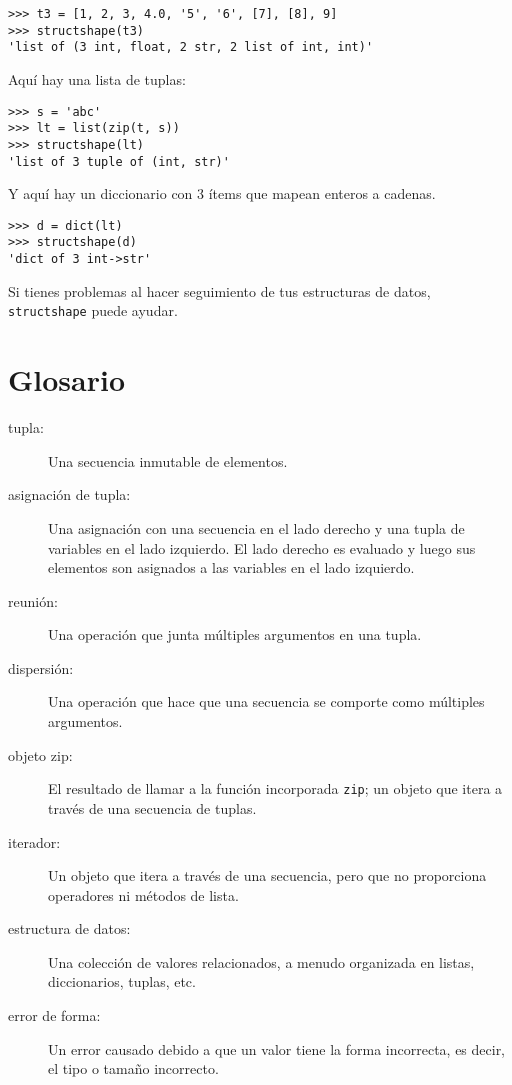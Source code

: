 \documentclass[10pt]{book}
\begin{document}
\begin{verbatim}
>>> t3 = [1, 2, 3, 4.0, '5', '6', [7], [8], 9]
>>> structshape(t3)
'list of (3 int, float, 2 str, 2 list of int, int)'
\end{verbatim}
%
Aquí hay una lista de tuplas:

\begin{verbatim}
>>> s = 'abc'
>>> lt = list(zip(t, s))
>>> structshape(lt)
'list of 3 tuple of (int, str)'
\end{verbatim}
%
Y aquí hay un diccionario con 3 ítems que mapean enteros a cadenas.

\begin{verbatim}
>>> d = dict(lt)
>>> structshape(d)
'dict of 3 int->str'
\end{verbatim}
%
Si tienes problemas al hacer seguimiento de tus estructuras de datos,
{\tt structshape} puede ayudar.


\section{Glosario}

\begin{description}

\item[tupla:] Una secuencia inmutable de elementos.

\item[asignación de tupla:] Una asignación con una secuencia en el
lado derecho y una tupla de variables en el lado izquierdo.  El lado
derecho es evaluado y luego sus elementos son asignados a las
variables en el lado izquierdo.

\item[reunión:] Una operación que junta múltiples argumentos en una tupla.

\item[dispersión:] Una operación que hace que una secuencia se comporte como múltiples argumentos.

\item[objeto zip:] El resultado de llamar a la función incorporada {\tt zip};
un objeto que itera a través de una secuencia de tuplas.

\item[iterador:] Un objeto que itera a través de una secuencia, pero
que no proporciona operadores ni métodos de lista.

\item[estructura de datos:] Una colección de valores relacionados, a menudo
organizada en listas, diccionarios, tuplas, etc.

\item[error de forma:] Un error causado debido a que un valor tiene la forma
incorrecta, es decir, el tipo o tamaño incorrecto.

\end{description}
\end{document}
